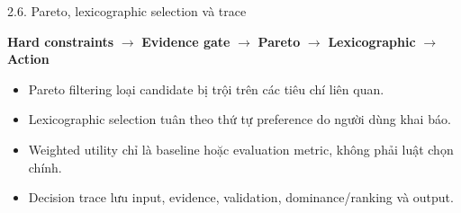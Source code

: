 \begin{frame}[t]{2.6. Pareto, lexicographic selection và trace}
\small
\begin{center}
\textbf{Hard constraints} $\rightarrow$ \textbf{Evidence gate} $\rightarrow$
\textbf{Pareto} $\rightarrow$ \textbf{Lexicographic} $\rightarrow$ \textbf{Action}
\end{center}
\begin{itemize}
  \item Pareto filtering loại candidate bị trội trên các tiêu chí liên quan.
  \item Lexicographic selection tuân theo thứ tự preference do người dùng khai báo.
  \item Weighted utility chỉ là baseline hoặc evaluation metric, không phải luật chọn chính.
  \item Decision trace lưu input, evidence, validation, dominance/ranking và output.
\end{itemize}
\end{frame}
